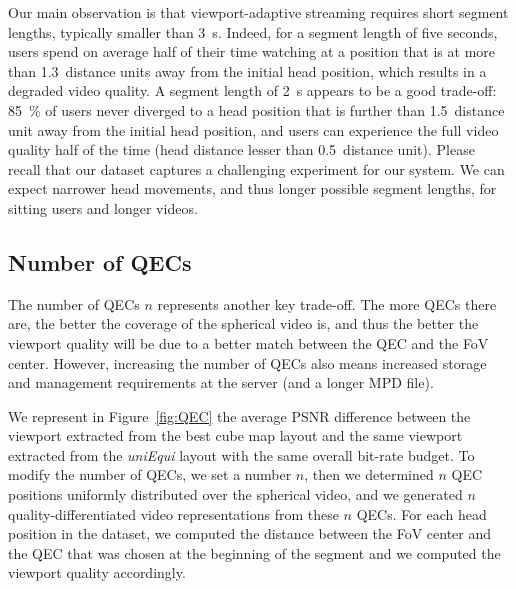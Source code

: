 Our main observation is that viewport-adaptive streaming requires
short segment lengths, typically smaller than \SI{3}{\second}. Indeed,
for a segment length of five seconds, users spend on average half of
their time watching at a position that is at more than
\num{1.3}~distance units away from the initial head position, which
results in a degraded video quality. A segment length of
\SI{2}{\second} appears to be a good trade-off: \SI{85}{\percent} of
users never diverged to a head position that is further than
\num{1.5}~distance unit away from the initial head position, and users
can experience the full video quality half of the time (head distance
lesser than \num{0.5}~distance unit). Please recall that our dataset
captures a challenging experiment for our system. We can expect
narrower head movements, and thus longer possible segment lengths, for
sitting users and longer videos.


\subsection{Number of \acp{QEC}}

The number of \acp{QEC} $n$ represents another key trade-off. The more
\acp{QEC} there are, the better the coverage of the spherical video
is, and thus the better the viewport quality will be due to a better
match between the \ac{QEC} and the \ac{FoV} center. However,
increasing the number of \acp{QEC} also means increased storage and
management requirements at the server (and a longer \ac{MPD} file).

We represent in Figure~\ref{fig:QEC} the average \ac{PSNR} difference
between the viewport extracted from the best cube map layout and the
same viewport extracted from the \emph{uniEqui} layout with the same
overall bit-rate budget. To modify the number of \acp{QEC}, we set a
number $n$, then we determined $n$ \ac{QEC} positions uniformly
distributed over the spherical video, and we generated $n$
quality-differentiated video representations from these $n$ \acp{QEC}.
For each head position in the dataset, we computed the distance
between the \ac{FoV} center and the \ac{QEC} that was chosen at the
beginning of the segment and we computed the viewport quality
accordingly.
%
%


